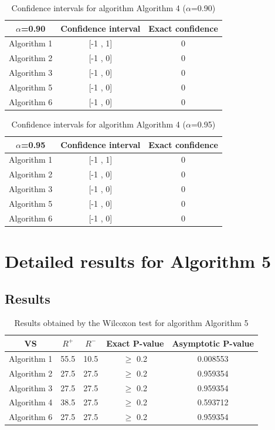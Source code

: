 \documentclass[a4paper,10pt]{article}
\begin{document}
\begin{table}[!htp]
\centering\small
\begin{tabular}{
|c|c|c|}
\hline
 $\alpha$=0.90 & Confidence interval & Exact confidence \\ \hline 
Algorithm 1 & [-1 , 1] & 0\\ \hline 
Algorithm 2 & [-1 , 0] & 0\\ \hline 
Algorithm 3 & [-1 , 0] & 0\\ \hline 
Algorithm 5 & [-1 , 0] & 0\\ \hline 
Algorithm 6 & [-1 , 0] & 0\\ \hline 

\end{tabular}
\caption{Confidence intervals for algorithm Algorithm 4 ($\alpha$=0.90)}
\end{table}
\begin{table}[!htp]
\centering\small
\begin{tabular}{
|c|c|c|}
\hline
 $\alpha$=0.95 & Confidence interval & Exact confidence \\ \hline 
Algorithm 1 & [-1 , 1] & 0\\ \hline 
Algorithm 2 & [-1 , 0] & 0\\ \hline 
Algorithm 3 & [-1 , 0] & 0\\ \hline 
Algorithm 5 & [-1 , 0] & 0\\ \hline 
Algorithm 6 & [-1 , 0] & 0\\ \hline 

\end{tabular}
\caption{Confidence intervals for algorithm Algorithm 4 ($\alpha$=0.95)}
\end{table}

 \clearpage 


\section{Detailed results for Algorithm 5}


\subsection{Results}

\begin{table}[!htp]
\centering\small
\begin{tabular}{
|c|c|c|c|c|}
\hline
 VS & $R^{+}$ & $R^{-}$ & Exact P-value & Asymptotic P-value \\ \hline 
Algorithm 1 & 55.5 & 10.5 & $\geq$ 0.2 & 0.008553\\ \hline 
Algorithm 2 & 27.5 & 27.5 & $\geq$ 0.2 & 0.959354\\ \hline 
Algorithm 3 & 27.5 & 27.5 & $\geq$ 0.2 & 0.959354\\ \hline 
Algorithm 4 & 38.5 & 27.5 & $\geq$ 0.2 & 0.593712\\ \hline 
Algorithm 6 & 27.5 & 27.5 & $\geq$ 0.2 & 0.959354\\ \hline 

\end{tabular}
\caption{Results obtained by the Wilcoxon test for algorithm Algorithm 5}
\end{table}
\end{document}
